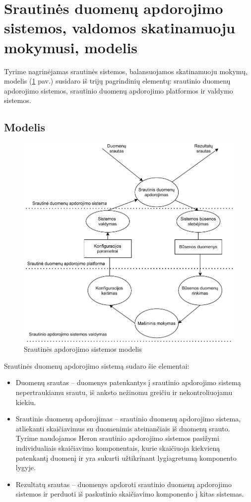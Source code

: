 \documentclass{VUMIFPSbakalaurinis}
\begin{document}
\section{Srautinės duomenų apdorojimo sistemos, valdomos skatinamuoju mokymusi, modelis}

Tyrime nagrinėjamas srautinės sistemos, balansuojamos skatinamuoju mokymų, modelis (\ref{dataflow} pav.) susidaro iš trijų pagrindinių elementų: srautinio duomenų apdorojimo sistemos, srautinio duomenų apdorojimo platformos ir valdymo sistemos. 
\subsection{Modelis}
\begin{figure}[H]
    \includegraphics[width=15cm]{img/DataFlow.pdf}
    \caption{Srautinės apdorojimo sistemos modelis}
    \label{dataflow}
\end{figure} 
Srautinės duomenų apdorojimo sistemą sudaro šie elementai:
\begin{itemize}
    \item Duomenų srautas – duomenys patenkantys į srautinio apdorojimo sistemą nepertraukiamu srautu, iš anksto nežinomu greičiu ir nekontroliuojamu kiekiu.
    \item Srautinis duomenų apdorojimas – srautinio duomenų apdorojimo sistema, atliekanti skaičiavimus su duomenimis ateinančiais iš duomenų srauto. Tyrime naudojamos Heron srautinio apdorojimo sistemos pasižymi individualiais skaičiavimo komponentais, kurie skaičiuoja kiekvieną patenkantį duomenį ir yra sukurti užtikrinant lygiagretumą komponento lygyje.
    \item Rezultatų srautas – duomenys apdoroti srautinio duomenų apdorojimo sistemos ir perduoti iš paskutinio skaičiavimo komponento į kitas sistemas.
\end{itemize}
\end{document}
